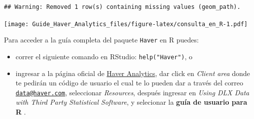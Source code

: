 \documentclass[
]{book}
\newenvironment{Shaded}{\begin{snugshade}}{\end{snugshade}}
\newcommand{\CommentTok}[1]{\textcolor[rgb]{0.56,0.35,0.01}{\textit{#1}}}
\newcommand{\DataTypeTok}[1]{\textcolor[rgb]{0.13,0.29,0.53}{#1}}
\newcommand{\DecValTok}[1]{\textcolor[rgb]{0.00,0.00,0.81}{#1}}
\newcommand{\FloatTok}[1]{\textcolor[rgb]{0.00,0.00,0.81}{#1}}
\newcommand{\KeywordTok}[1]{\textcolor[rgb]{0.13,0.29,0.53}{\textbf{#1}}}
\newcommand{\NormalTok}[1]{#1}
\newcommand{\OperatorTok}[1]{\textcolor[rgb]{0.81,0.36,0.00}{\textbf{#1}}}
\newcommand{\StringTok}[1]{\textcolor[rgb]{0.31,0.60,0.02}{#1}}
\begin{document}
\begin{Shaded}
\end{Shaded}

\begin{verbatim}
## Warning: Removed 1 row(s) containing missing values (geom_path).
\end{verbatim}

\texttt{[image: Guide\_Haver\_Analytics\_files/figure-latex/consulta\_en\_R-1.pdf]}

Para acceder a la guía completa del paquete \texttt{Haver} en R puedes:

\begin{itemize}
\item
  correr el siguiente comando en RStudio: \texttt{help("Haver")}, o
\item
  ingresar a la página oficial de \href{http://www.haver.com}{Haver Analytics}, dar click en \emph{Client area} donde te pedirán un código de usuario el cual te lo pueden dar a través del correo \href{mailto:data@haver.com}{\nolinkurl{data@haver.com}}, seleccionar \emph{Resources}, después ingresar en \emph{Using DLX Data with Third Party Statistical Software}, y selecionar la \textbf{guía de usuario para R} \citep{haver_r}.
\end{itemize}
\end{document}
